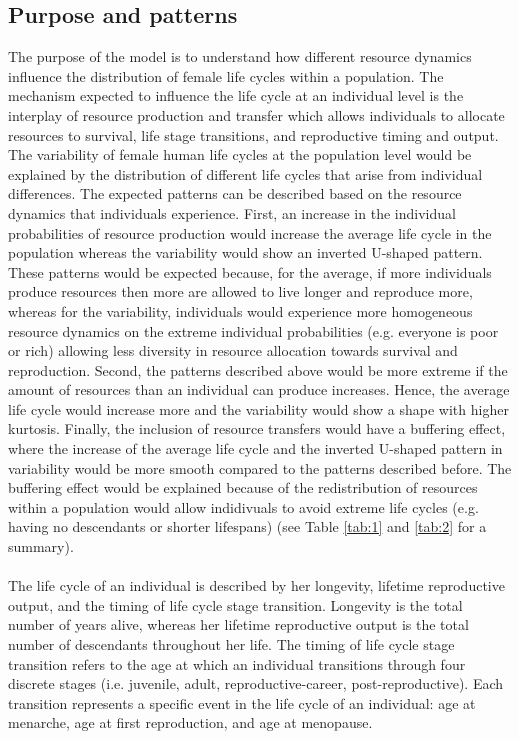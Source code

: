 \documentclass{article}
\begin{document}
\subsection{Purpose and patterns}

The purpose of the model is to understand how different resource dynamics influence the distribution of female life cycles within a population. The mechanism expected to influence the life cycle at an individual level is the interplay of resource production and transfer which allows individuals to allocate resources to survival, life stage transitions, and reproductive timing and output. The variability of female human life cycles at the population level would be explained by the distribution of different life cycles that arise from individual differences. The expected patterns can be described based on the resource dynamics that individuals experience. First, an increase in the individual probabilities of resource production would increase the average life cycle in the population whereas the variability would show an inverted U-shaped pattern. These patterns would be expected because, for the average, if more individuals produce resources then more are allowed to live longer and reproduce more, whereas for the variability, individuals would experience more homogeneous resource dynamics on the extreme individual probabilities (e.g. everyone is poor or rich) allowing less diversity in resource allocation towards survival and reproduction. Second, the patterns described above would be more extreme if the amount of resources than an individual can produce increases. Hence, the average life cycle would increase more and the variability would show a shape with higher kurtosis. Finally, the inclusion of resource transfers would have a buffering effect, where the increase of the average life cycle and the inverted U-shaped pattern in variability would be more smooth compared to the patterns described before. The buffering effect would be explained because of the redistribution of resources within a population would allow indidivuals to avoid extreme life cycles (e.g. having no descendants or shorter lifespans) (see Table \ref{tab:1} and \ref{tab:2} for a summary).
\\\\
The life cycle of an individual is described by her longevity, lifetime reproductive output, and the timing of life cycle stage transition. Longevity is the total number of years alive, whereas her lifetime reproductive output is the total number of descendants throughout her life. The timing of life cycle stage transition refers to the age at which an individual transitions through four discrete stages (i.e. juvenile, adult, reproductive-career, post-reproductive). Each transition represents a specific event in the life cycle of an individual: age at menarche, age at first reproduction, and age at menopause.
\end{document}
